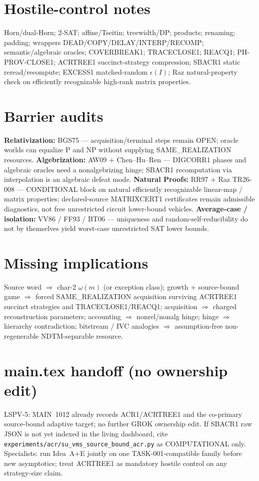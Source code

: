 \documentclass[11pt]{article}
\begin{document}
\section*{Hostile-control notes}
Horn/dual-Horn; 2-SAT; affine/Tseitin; treewidth/DP; products; renaming; padding;
wrappers DEAD/COPY/DELAY/INTERP/RECOMP; semantic/algebraic oracles; COVERBREAK1;
TRACECLOSE1; REACQ1; PH-PROV-CLOSE1; ACRTREE1 succinct-strategy compression; SBACR1
static reread/recompute; EXCESS1 matched-random $\epsilon(I)$; Raz natural-property check on
efficiently recognizable high-rank matrix properties.

\section*{Barrier audits}
\textbf{Relativization:} BGS75 --- acquisition/terminal steps remain OPEN; oracle worlds can
equalize P and NP without supplying SAME\_REALIZATION resources.
\textbf{Algebrization:} AW09 + Chen--Hu--Ren --- DIGCORR1 phases and algebraic oracles need a
nonalgebrizing hinge; SBACR1 recomputation via interpolation is an algebraic defeat mode.
\textbf{Natural Proofs:} RR97 + Raz TR26-008 --- CONDITIONAL block on natural efficiently
recognizable linear-map / matrix properties; declared-source MATRIXCERT1 certificates remain
admissible diagnostics, not free unrestricted circuit lower-bound vehicles.
\textbf{Average-case / isolation:} VV86 / FF93 / BT06 --- uniqueness and random-self-reducibility
do not by themselves yield worst-case unrestricted SAT lower bounds.

\section*{Missing implications}
Source word $\Rightarrow$ char-$2$ $\omega(m)$ (or exception class);
growth + source-bound game $\Rightarrow$ forced SAME\_REALIZATION acquisition surviving
ACRTREE1 succinct strategies and TRACECLOSE1/REACQ1;
acquisition $\Rightarrow$ charged reconstruction parameters;
accounting $\Rightarrow$ nonrel/nonalg hinge;
hinge $\Rightarrow$ hierarchy contradiction;
bitstream / IVC analogies $\Rightarrow$ assumption-free non-regenerable NDTM-separable resource.

\section*{main.tex handoff (no ownership edit)}
LSPV-5: MAIN~1012 already records ACR1/ACRTREE1 and the co-primary source-bound adaptive target;
no further GROK ownership edit. If SBACR1 raw JSON is not yet indexed in the living dashboard,
cite \texttt{experiments/acr/su\_vms\_source\_bound\_acr.py} as COMPUTATIONAL only.
Specialists: run Idea~A+E jointly on one TASK-001-compatible family before new asymptotics;
treat ACRTREE1 as mandatory hostile control on any strategy-size claim.
\end{document}
